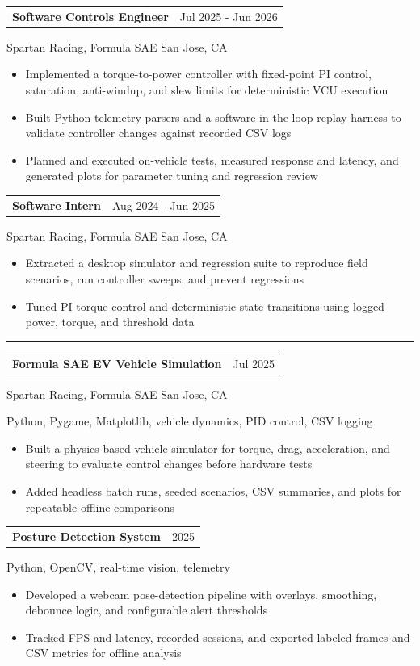 \documentclass[10pt,letterpaper]{article}
\makeatletter
\newcommand{\sectionheader}[1]{%
  \vspace{4pt}
  \noindent\rule{\textwidth}{0.35pt}\par
  \vspace{4pt}
  \noindent{\fontsize{12.5}{13.5}\selectfont\textbf{#1}}\par
  \vspace{3pt}
}
\newcommand{\roleline}[2]{%
  \noindent
  \begin{tabular*}{\textwidth}{@{\extracolsep{\fill}} l r}
    \textbf{#1} & #2 \\
  \end{tabular*}
  \vspace{-2pt}
}
\newcommand{\orgline}[1]{%
  #1\par
  \vspace{1pt}
}
\newcommand{\techline}[1]{%
  #1\par
  \vspace{1pt}
}
\newcommand{\entryspace}{\vspace{2pt}}
\makeatother
\begin{document}
\entryspace

\roleline{Software Controls Engineer}{Jul 2025 - Jun 2026}
\orgline{Spartan Racing, Formula SAE\textbar{} San Jose, CA}
\begin{itemize}
  \item Implemented a torque-to-power controller with fixed-point PI control, saturation, anti-windup, and slew limits for deterministic VCU execution
  \item Built Python telemetry parsers and a software-in-the-loop replay harness to validate controller changes against recorded CSV logs
  \item Planned and executed on-vehicle tests, measured response and latency, and generated plots for parameter tuning and regression review
\end{itemize}

\entryspace

\roleline{Software Intern}{Aug 2024 - Jun 2025}
\orgline{Spartan Racing, Formula SAE\textbar{} San Jose, CA}
\begin{itemize}
  \item Extracted a desktop simulator and regression suite to reproduce field scenarios, run controller sweeps, and prevent regressions
  \item Tuned PI torque control and deterministic state transitions using logged power, torque, and threshold data
\end{itemize}

\sectionheader{PROJECT EXPERIENCE}

\roleline{Formula SAE EV Vehicle Simulation}{Jul 2025}
\orgline{Spartan Racing, Formula SAE\textbar{} San Jose, CA}
\techline{Python, Pygame, Matplotlib, vehicle dynamics, PID control, CSV logging}
\begin{itemize}
  \item Built a physics-based vehicle simulator for torque, drag, acceleration, and steering to evaluate control changes before hardware tests
  \item Added headless batch runs, seeded scenarios, CSV summaries, and plots for repeatable offline comparisons
\end{itemize}

\entryspace

\roleline{Posture Detection System}{2025}
\techline{Python, OpenCV, real-time vision, telemetry}
\begin{itemize}
  \item Developed a webcam pose-detection pipeline with overlays, smoothing, debounce logic, and configurable alert thresholds
  \item Tracked FPS and latency, recorded sessions, and exported labeled frames and CSV metrics for offline analysis
\end{itemize}
\end{document}

